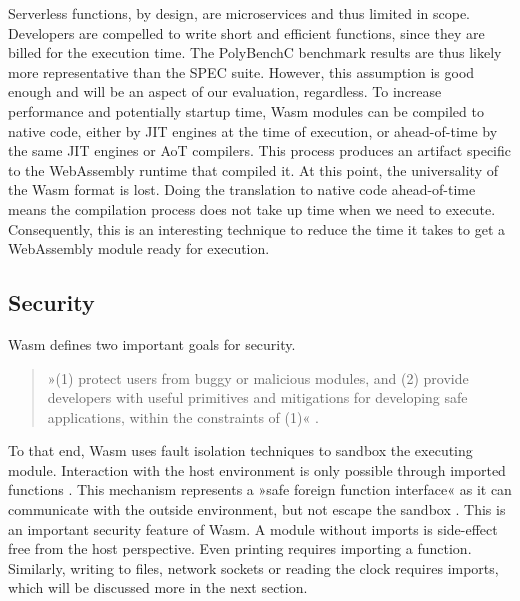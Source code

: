 Serverless functions, by design, are microservices and thus limited in scope. Developers are compelled to write short and efficient functions, since they are billed for the execution time. The PolyBenchC benchmark results are thus likely more representative than the SPEC suite. However, this assumption is good enough and will be an aspect of our evaluation, regardless.
To increase performance and potentially startup time, Wasm modules can be compiled to native code, either by JIT engines at the time of execution, or ahead-of-time by the same JIT engines or AoT compilers. This process produces an artifact specific to the WebAssembly runtime that compiled it. At this point, the universality of the Wasm format is lost. Doing the translation to native code ahead-of-time means the compilation process does not take up time when we need to execute. Consequently, this is an interesting technique to reduce the time it takes to get a WebAssembly module ready for execution.




\subsection{Security}

Wasm defines two important goals for security.

\begin{quote}
    »(1) protect users from buggy or malicious modules, and (2) provide developers with useful primitives and mitigations for developing safe applications, within the constraints of (1)« \cite{W3C2020}.
\end{quote}

To that end, Wasm uses fault isolation techniques to sandbox the executing module. Interaction with the host environment is only possible through imported functions \cite{W3C2020}. This mechanism represents a »safe foreign function interface« as it can communicate with the outside environment, but not escape the sandbox \cite{Haas2017}. This is an important security feature of Wasm. A module without imports is side-effect free from the host perspective. Even printing  requires importing a  function. Similarly, writing to files, network sockets or reading the clock requires imports, which will be discussed more in the next section.

